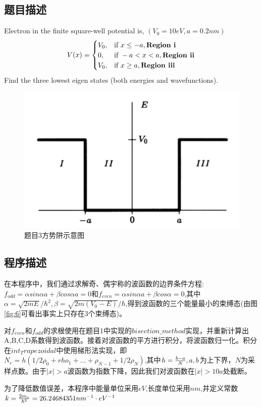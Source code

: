 \documentclass[11pt]{article}
\begin{document}
  \subsection{题目描述}
  Electron in the finite square-well potential is,  $(V_0=10eV,a=0.2 nm)$
  $$
  V(x)=\begin{cases} 
    V_0, & \text{if } x \leq -a ,\textbf{Region \uppercase\expandafter{\romannumeral 1}}\\
    0, & \text{if } -a< x < a ,\textbf{Region \uppercase\expandafter{\romannumeral 2}}\\ V_0, & \text{if } x \geq a ,\textbf{Region \uppercase\expandafter{\romannumeral 3}}\\
 \end{cases}
  $$
Find the three lowest eigen states (both energies and wavefunctions).
  \begin{figure}[ht]
    \centering
    \includegraphics[width=0.6\linewidth]{photo/fig5.png}
    \caption{题目3方势阱示意图}
    \label{fig:5}
  \end{figure}
\subsection{程序描述}
在本程序中，我们通过求解奇、偶宇称的波函数的边界条件方程:$f_{odd}=\alpha sin \alpha a+\beta cos \alpha a=0$和$f_{even}=\alpha sin\alpha a+\beta cos\alpha=0$,其中$\alpha =\sqrt{2 m E}/\hbar^2,\beta=\sqrt{2 m(V_0-E)}/\hbar$,得到波函数的三个能量最小的束缚态(由图\ref{fig:6}可看出事实上只存在3个束缚态)。

对$f_{even}$和$f_{odd}$的求根使用在题目1中实现的$bisection\_method$实现，并重新计算出A,B,C,D系数得到波函数。接着对波函数的平方进行积分，将波函数归一化。积分在$int_Trapezoidal$中使用梯形法实现，即$N_e=h(1/2 \rho_0+rho_1+...+\rho_{N-1}+1/2\rho_N)$,其中$h={b-a\over N},a,b$为上下界，$N$为采样点数。由于$|x|>a$波函数为指数下降，因此我们对波函数在$|x|>10a$处截断。

为了降低数值误差，本程序中能量单位采用$eV$,长度单位采用$nm$,并定义常数$k={2 m_e\over\hbar^2}=26.24684351 nm^{-1}\cdot eV^{-1}$
\end{document}
